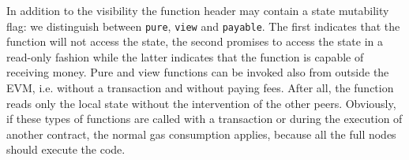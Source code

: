 In addition to the visibility the function header may contain a state mutability
flag: we distinguish between \texttt{pure}, \texttt{view} and \texttt{payable}.
The first indicates that the function will not access the state, the second
promises to access the state in a read-only fashion while the latter indicates
that the function is capable of receiving money.
Pure and view functions can be invoked also from outside the EVM, i.e. without
a transaction and without paying fees. After all, the function reads only the
local state without the intervention of the other peers.
Obviously, if these types of functions are called with a transaction or during
the execution of another contract, the normal gas consumption applies, because
all the full nodes should execute the code.




